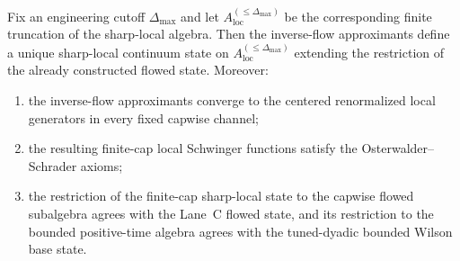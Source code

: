 \begin{theorem}
Fix an engineering cutoff $\Delta_{\max}$ and let $A_{\mathrm{loc}}^{(\le \Delta_{\max})}$ be the corresponding finite truncation of the sharp-local algebra. Then the inverse-flow approximants define a unique sharp-local continuum state on $A_{\mathrm{loc}}^{(\le \Delta_{\max})}$ extending the restriction of the already constructed flowed state. Moreover:
\begin{enumerate}[label=(\alph*),leftmargin=2.2em]
\item the inverse-flow approximants converge to the centered renormalized local generators in every fixed capwise channel;
\item the resulting finite-cap local Schwinger functions satisfy the Osterwalder--Schrader axioms;
\item the restriction of the finite-cap sharp-local state to the capwise flowed subalgebra agrees with the Lane~C flowed state, and its restriction to the bounded positive-time algebra agrees with the tuned-dyadic bounded Wilson base state.
\end{enumerate}
\end{theorem}

